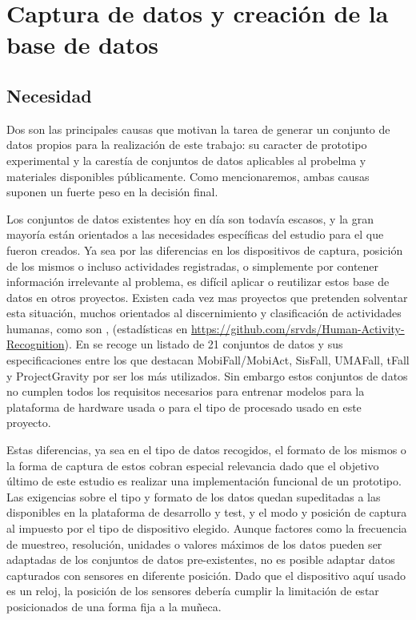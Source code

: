 
\section{Captura de datos y creación de la base de datos}
\subsection{Necesidad}
Dos son las principales causas que motivan la tarea de generar un conjunto de datos propios para la realización de este trabajo: su caracter de prototipo experimental y la carestía de conjuntos de datos aplicables al probelma y materiales disponibles públicamente. Como mencionaremos, ambas causas suponen un fuerte peso en la decisión final.

Los conjuntos de datos existentes hoy en día son todavía escasos, y la gran mayoría están orientados a las necesidades específicas del estudio para el que fueron creados. Ya sea por las diferencias en los dispositivos de captura, posición de los mismos o incluso actividades registradas, o simplemente por contener información irrelevante al problema, es difícil aplicar o reutilizar estos base de datos en otros proyectos. Existen cada vez mas proyectos que pretenden solventar esta situación, muchos orientados al discernimiento y clasificación de actividades humanas, como son \cite{Anguita2013,ReyesOrtiz2014}, (estadísticas en \url{https://github.com/srvds/Human-Activity-Recognition}). En \cite{Casilari2020} se recoge un listado de 21 conjuntos de datos y sus especificaciones entre los que destacan MobiFall\cite{MobiFall}/MobiAct\cite{MobiAct}, SisFall\cite{Sucerquia2017}, UMAFall\cite{Edu/UMA/2017}, tFall\cite{tfall} y ProjectGravity\cite{Vilarinho2015} por ser los más utilizados. Sin embargo estos conjuntos de datos no cumplen todos los requisitos necesarios para entrenar modelos para la plataforma de hardware usada o para el tipo de procesado usado en este proyecto.

Estas diferencias, ya sea en el tipo de datos recogidos, el formato de los mismos o la forma de captura de estos cobran especial relevancia dado que el objetivo último de este estudio es realizar una implementación funcional de un prototipo. Las exigencias sobre el tipo y formato de los datos quedan supeditadas a las disponibles en la plataforma de desarrollo y test, y el modo y posición de captura al impuesto por el tipo de dispositivo elegido. Aunque factores como la frecuencia de muestreo, resolución, unidades o valores máximos de los datos pueden ser adaptadas de los conjuntos de datos pre-existentes, no es posible adaptar datos capturados con sensores en diferente posición. Dado que el dispositivo aquí usado es un reloj, la posición de los sensores debería cumplir la limitación de estar posicionados de una forma fija a la muñeca.

